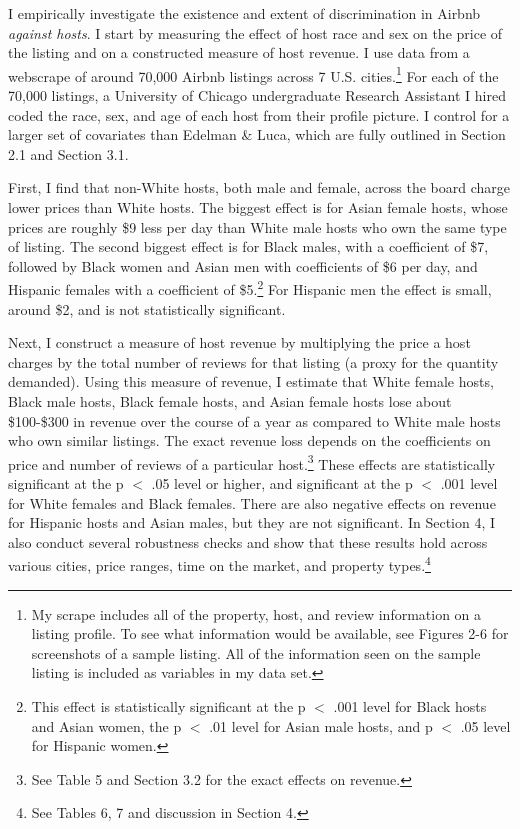 \documentclass[11pt, oneside]{article}
\begin{document}
I empirically investigate the existence and extent of discrimination in Airbnb \textit{against hosts}. I start by measuring the effect of host race and sex on the price of the listing and on a constructed measure of host revenue. I use data from a webscrape of around 70,000 Airbnb listings across 7 U.S. cities.\footnote{My scrape includes all of the property, host, and review information on a listing profile. To see what information would be available, see Figures 2-6 for screenshots of a sample listing. All of the information seen on the sample listing is included as variables in my data set.} For each of the 70,000 listings, a University of Chicago undergraduate Research Assistant I hired coded the race, sex, and age of each host from their profile picture. I control for a larger set of covariates than Edelman \& Luca, which are fully outlined in Section 2.1 and Section 3.1. 

First, I find that non-White hosts, both male and female, across the board charge lower prices than White hosts. The biggest effect is for Asian female hosts, whose prices are roughly \$9 less per day than White male hosts who own the same type of listing. The second biggest effect is for Black males, with a coefficient of \$7, followed by Black women and Asian men with coefficients of \$6 per day, and Hispanic females with a coefficient of \$5.\footnote{This effect is statistically significant at the p $<$ .001 level for Black hosts and Asian women, the p $<$ .01 level for Asian male hosts, and p $<$ .05 level for Hispanic women.} For Hispanic men the effect is small, around \$2, and is not statistically significant.
    
Next, I construct a measure of host revenue by multiplying the price a host charges by the total number of reviews for that listing (a proxy for the quantity demanded). Using this measure of revenue, I estimate that White female hosts, Black male hosts, Black female hosts, and Asian female hosts lose about \$100-\$300 in revenue over the course of a year as compared to White male hosts who own similar listings. The exact revenue loss depends on the coefficients on price and number of reviews of a particular host.\footnote{See Table 5 and Section 3.2 for the exact effects on revenue.} These effects are statistically significant at the p $<$ .05 level or higher, and significant at the p $<$ .001 level for White females and Black females. There are also negative effects on revenue for Hispanic hosts and Asian males, but they are not significant. In Section 4, I also conduct several robustness checks and show that these results hold across various cities, price ranges, time on the market, and property types.\footnote{See Tables 6, 7 and discussion in Section 4.}
\end{document}
